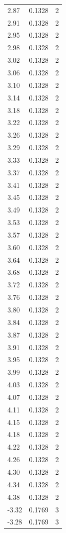 \begin{longtable}{lrr}
  2.87 & 0.1328 & 2 \\
  2.91 & 0.1328 & 2 \\
  2.95 & 0.1328 & 2 \\
  2.98 & 0.1328 & 2 \\
  3.02 & 0.1328 & 2 \\
  3.06 & 0.1328 & 2 \\
  3.10 & 0.1328 & 2 \\
  3.14 & 0.1328 & 2 \\
  3.18 & 0.1328 & 2 \\
  3.22 & 0.1328 & 2 \\
  3.26 & 0.1328 & 2 \\
  3.29 & 0.1328 & 2 \\
  3.33 & 0.1328 & 2 \\
  3.37 & 0.1328 & 2 \\
  3.41 & 0.1328 & 2 \\
  3.45 & 0.1328 & 2 \\
  3.49 & 0.1328 & 2 \\
  3.53 & 0.1328 & 2 \\
  3.57 & 0.1328 & 2 \\
  3.60 & 0.1328 & 2 \\
  3.64 & 0.1328 & 2 \\
  3.68 & 0.1328 & 2 \\
  3.72 & 0.1328 & 2 \\
  3.76 & 0.1328 & 2 \\
  3.80 & 0.1328 & 2 \\
  3.84 & 0.1328 & 2 \\
  3.87 & 0.1328 & 2 \\
  3.91 & 0.1328 & 2 \\
  3.95 & 0.1328 & 2 \\
  3.99 & 0.1328 & 2 \\
  4.03 & 0.1328 & 2 \\
  4.07 & 0.1328 & 2 \\
  4.11 & 0.1328 & 2 \\
  4.15 & 0.1328 & 2 \\
  4.18 & 0.1328 & 2 \\
  4.22 & 0.1328 & 2 \\
  4.26 & 0.1328 & 2 \\
  4.30 & 0.1328 & 2 \\
  4.34 & 0.1328 & 2 \\
  4.38 & 0.1328 & 2 \\
  -3.32 & 0.1769 & 3 \\
  -3.28 & 0.1769 & 3 \\

\end{longtable}
